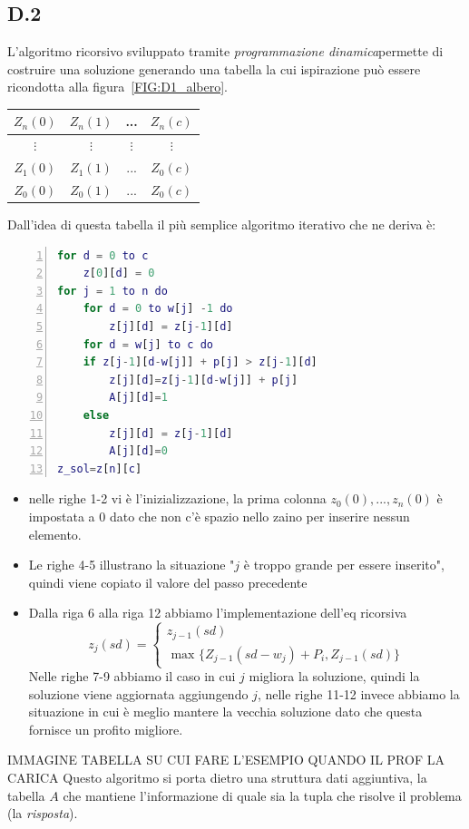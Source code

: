 \documentclass[a4paper]{article}
\begin{document}
\subsection{D.2}
L'algoritmo ricorsivo sviluppato tramite \textit{programmazione dinamica}permette di costruire una soluzione generando una tabella la cui ispirazione può essere ricondotta alla figura~\ref{FIG:D1_albero}.\\
\begin{center}
	\begin{tabular}{| c | c | c | c |}
  \hline
  $Z_n(0)$ & $Z_n(1)$ & ... &  $Z_n(c)$ \\
  \hline
  $ \vdots$ & $\vdots$ & $\vdots$ &  $\vdots $ \\
  \hline
  $Z_1(0)$ & $Z_1(1)$ & ... &  $Z_0(c)$ \\
  \hline
  $Z_0(0)$ & $Z_0(1)$ & ... &  $Z_0(c)$ \\
  \hline
	\end{tabular}
\end{center}
Dall'idea di questa tabella il più semplice algoritmo iterativo che ne deriva è:
\begin{lstlisting}[numbers=left,firstnumber=1,stepnumber=1, xleftmargin=15pt, language=Matlab ]
for d = 0 to c
    z[0][d] = 0
for j = 1 to n do
    for d = 0 to w[j] -1 do
    	z[j][d] = z[j-1][d]
    for d = w[j] to c do
	if z[j-1][d-w[j]] + p[j] > z[j-1][d] 
	    z[j][d]=z[j-1][d-w[j]] + p[j]
	    A[j][d]=1
	else
	    z[j][d] = z[j-1][d]
	    A[j][d]=0
z_sol=z[n][c]
\end{lstlisting}
\begin{itemize}
	\item nelle righe 1-2 vi è l'inizializzazione, la prima colonna $z_0(0),...,z_n(0)$ è impostata a 0 dato che non c'è spazio nello zaino per inserire nessun elemento.\\
	\item Le righe 4-5 illustrano la situazione "$j$ è troppo grande per essere inserito", quindi viene copiato il valore del passo precedente
	\item Dalla riga 6 alla riga 12 abbiamo l'implementazione dell'eq ricorsiva
	\begin{equation*}
        	z_j(sd)= \begin{cases} z_{j-1}(sd)\\
        	\text{ max } \{ Z_{j-1}(sd - w_j) + P_i , Z_{j-1}(sd) \}
	\end{cases}
	\end{equation*}
	Nelle righe 7-9 abbiamo il caso in cui $j$ migliora la soluzione, quindi la soluzione viene aggiornata aggiungendo $j$, nelle righe 11-12 invece abbiamo la situazione in cui è meglio mantere la vecchia soluzione dato che questa fornisce un profito migliore.
\end{itemize}
IMMAGINE TABELLA SU CUI FARE L'ESEMPIO QUANDO IL PROF LA CARICA
Questo algoritmo si porta dietro una struttura dati aggiuntiva, la tabella $A$ che mantiene l'informazione di quale sia la tupla che risolve il problema (la \textit{risposta}).
\end{document}
